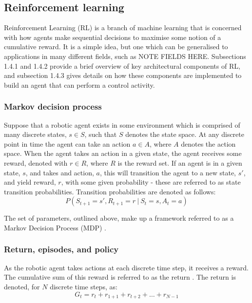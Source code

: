 \documentclass[12pt, a4paper]{article}
\begin{document}
\subsection{Reinforcement learning}
Reinforcement Learning (RL) is a branch of machine learning that is concerned with how agents make sequential decisions to maximise some notion of a cumulative reward. It is a simple idea, but one which can be generalised to applications in many different fields, such as NOTE FIELDS HERE. Subsections 1.4.1 and 1.4.2 provide a brief overview of key architectural components of RL, and subsection 1.4.3 gives details on how these components are implemented to build an agent that can perform a control activity.

\subsubsection{Markov decision process}
Suppose that a robotic agent exists in some environment which is comprised of many discrete states, $s \in S$, such that $S$ denotes the state space. At any discrete point in time the agent can take an action $a \in A$, where $A$ denotes the action space. When the agent takes an action in a given state, the agent receives some reward, denoted with $r \in R$, where $R$ is the reward set. If an agent is in a given state, $s$, and takes and action, $a$, this will transition the agent to a new state, $s'$, and yield reward, $r$, with some given probability - these are referred to as state transition probabilities. Transition probabilities are denoted as follows:
\begin{equation}
P(S_{t+1}=s', R_{t+1}=r \ | \ S_t = s, A_t = a)
\end{equation}

The set of parameters, outlined above, make up a framework referred to as a Markov Decision Process (MDP) \cite{sutton2018}.

\subsubsection{Return, episodes, and policy}
As the robotic agent takes actions at each discrete time step, it receives a reward. The cumulative sum of this reward is referred to as the return \cite{sutton2018}. The return is denoted, for $N$ discrete time steps, as:
\begin{equation}
G_t = r_t + r_{1+1} + r_{t+2} + \ldots + r_{N-1}
\end{equation}
\end{document}
